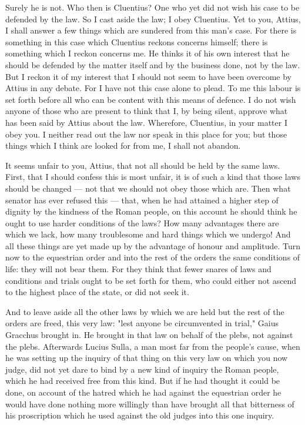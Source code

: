  Surely he is not. Who then is Cluentius? One who yet did not wish his case to be defended by the law. So I cast aside the law; I obey Cluentius. Yet to you, Attius, I shall answer a few things which are sundered from this man's case. For there is something in this case which Cluentius reckons concerns himself; there is something which I reckon concerns me. He thinks it of his own interest that he should be defended by the matter itself and by the business done, not by the law. But I reckon it of my interest that I should not seem to have been overcome by Attius in any debate. For I have not this case alone to plead. To me this labour is set forth before all who can be content with this means of defence. I do not wish anyone of those who are present to think that I, by being silent, approve what has been said by Attius about the law. Wherefore, Cluentius, in your matter I obey you. I neither read out the law nor speak in this place for you; but those things which I think are looked for from me, I shall not abandon.

 It seems unfair to you, Attius, that not all should be held by the same laws. First, that I should confess this is most unfair, it is of such a kind that those laws should be changed --- not that we should not obey those which are. Then what senator has ever refused this --- that, when he had attained a higher step of dignity by the kindness of the Roman people, on this account he should think he ought to use harder conditions of the laws? How many advantages there are which we lack, how many troublesome and hard things which we undergo! And all these things are yet made up by the advantage of honour and amplitude. Turn now to the equestrian order and into the rest of the orders the same conditions of life: they will not bear them. For they think that fewer snares of laws and conditions and trials ought to be set forth for them, who could either not ascend to the highest place of the state, or did not seek it.

 And to leave aside all the other laws by which we are held but the rest of the orders are freed, this very law: "lest anyone be circumvented in trial," Gaius Gracchus brought in. He brought in that law on behalf of the plebs, not against the plebs. Afterwards Lucius Sulla, a man most far from the people's cause, when he was setting up the inquiry of that thing on this very law on which you now judge, did not yet dare to bind by a new kind of inquiry the Roman people, which he had received free from this kind. But if he had thought it could be done, on account of the hatred which he had against the equestrian order he would have done nothing more willingly than have brought all that bitterness of his proscription which he used against the old judges into this one inquiry.

